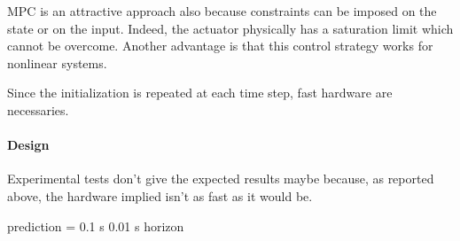 MPC is an attractive approach also because constraints can be imposed on the state or on the input. Indeed, the actuator physically has a saturation limit which cannot be overcome. Another advantage is that this control strategy works for nonlinear systems.

Since the initialization is repeated at each time step, fast hardware are necessaries.

\paragraph{Design} Experimental tests don't give the expected results maybe because, as reported above, the hardware implied isn't as fast as it would be.

prediction = 0.1 s
0.01 s horizon

\label{subsubsec:mpc_linear}